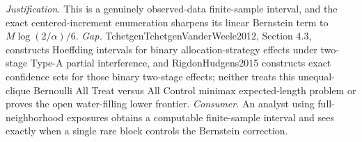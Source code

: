 \documentclass{article}
\begin{document}
\par\smallskip\noindent \textit{Justification.} This is a genuinely observed-data finite-sample interval, and the exact centered-increment enumeration sharpens its linear Bernstein term to \(M\log(2/\alpha)/6\). \textit{Gap.} TchetgenTchetgenVanderWeele2012, Section 4.3, constructs Hoeffding intervals for binary allocation-strategy effects under two-stage Type-A partial interference, and RigdonHudgens2015 constructs exact confidence sets for those binary two-stage effects; neither treats this unequal-clique Bernoulli All Treat versus All Control minimax expected-length problem or proves the open water-filling lower frontier. \textit{Consumer.} An analyst using full-neighborhood exposures obtains a computable finite-sample interval and sees exactly when a single rare block controls the Bernstein correction.
\end{document}
